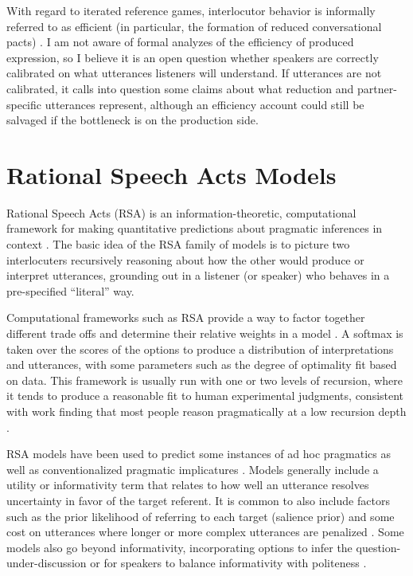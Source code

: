 \documentclass[]{article}
\begin{document}
With regard to iterated reference games, interlocutor behavior is informally referred to as efficient (in particular, the formation of reduced conversational pacts) \citep{clark1986, hawkins2020b}. I am not aware of formal analyzes of the efficiency of produced expression, so I believe it is an open question whether speakers are correctly calibrated on what utterances listeners will understand. If utterances are not calibrated, it calls into question some claims about what reduction and partner-specific utterances represent, although an efficiency account could still be salvaged if the bottleneck is on the production side.


\section{Rational Speech Acts Models}


Rational Speech Acts (RSA) is an information-theoretic, computational framework for making quantitative predictions about pragmatic inferences in context \citep{goodman2016, frank2012a}. The basic idea of the RSA family of models is to picture two interlocuters recursively reasoning about how the other would produce or interpret utterances, grounding out in a listener (or speaker) who behaves in a pre-specified ``literal'' way. 

Computational frameworks such as RSA provide a way to factor together different trade offs and determine their relative weights in a model \citep{goodman2016}. A softmax is taken over the scores of the options to produce a distribution of interpretations and utterances, with some parameters such as the degree of optimality fit based on data.  
This framework is usually run with one or two levels of recursion, where it tends to produce a reasonable fit to human experimental judgments, consistent with work finding that most people reason pragmatically at a low recursion depth \citep{franke2016}. 

RSA models have been used to predict some instances of ad hoc pragmatics as well as conventionalized pragmatic implicatures \citep{bergen, degen20200406, goodman2013}. Models generally include a utility or informativity term that relates to how well an utterance resolves uncertainty in favor of the target referent.  It is common to also include factors such as the prior likelihood of referring to each target (salience prior) and some cost on utterances where longer or more complex utterances are penalized \citep{goodman2016}. Some models also go beyond informativity, incorporating options to infer the question-under-discussion \citep{qing2016, kao2014} or for speakers to balance informativity with politeness \citep{yoon2018a}.
\end{document}
